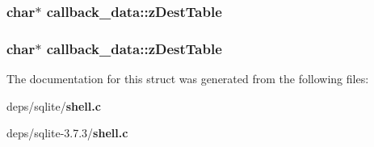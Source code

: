 \subsubsection{\setlength{\rightskip}{0pt plus 5cm}char$\ast$ \bf{callback\_\-data::z\-Dest\-Table}}\label{structcallback__data_daff1b8fabefff95ad89ef0b891cf1a7}


\subsubsection{\setlength{\rightskip}{0pt plus 5cm}char$\ast$ \bf{callback\_\-data::z\-Dest\-Table}}\label{structcallback__data_daff1b8fabefff95ad89ef0b891cf1a7}




The documentation for this struct was generated from the following files:\begin{CompactItemize}
\item 
deps/sqlite/\bf{shell.c}\item 
deps/sqlite-3.7.3/\bf{shell.c}\end{CompactItemize}
